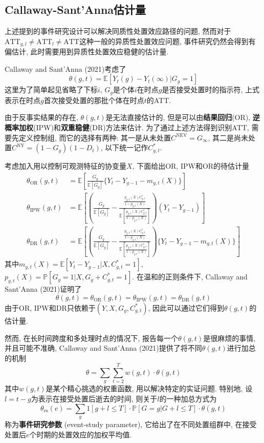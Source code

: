 \documentclass[cn,sakura,14pt,screen,bibstyle=gb7714-2015,math=mtpro2]{elegantnote}
\newcommand{\E}{\mathbb{E}}
\newcommand{\X}{X}
\begin{document}
\subsection{Callaway-Sant'Anna估计量}
上述提到的事件研究设计可以解决同质性处置效应路径的问题, 然而对于$\text{ATT}_{g,l}\neq\text{ATT}_l\ne\text{ATT}$这种一般的异质性处置效应问题, 事件研究仍然会得到有偏估计, 此时需要用到异质性处置效应稳健的估计量.

Callaway and Sant'Anna (2021)考虑了
$$\theta(g,t)=\E[Y_{t}(g)-Y_{t}(\infty)|G_g=1]$$
这里为了简单起见省略了下标$i$, $G_g$是个体$i$在时点$g$是否接受处置时的指示符, 上式表示在时点$g$首次接受处置的那批个体在时点$t$的ATT.

由于反事实结果的存在, $\theta(g,t)$是无法直接估计的, 但是可以由\textbf{结果回归}(OR), \textbf{逆概率加权}(IPW)和\textbf{双重稳健}(DR)方法来估计. 为了通过上述方法得到识别ATT, 需要先定义控制组, 而它的选择有两种: 其一是从未处置$C^\text{NEV}=G_\infty$, 其二是尚未处置$C^\text{NY}=(1-G_g)(1-D_t)$, 以下统一记作$C_{g,t}^\ast$.

考虑加入用以控制可观测特征的协变量$\X$, 下面给出OR, IPW和OR的待估计量
\begin{align*}
\theta_\text{OR}(g,t)&=\E\left[\frac{G_g}{\E[G_g]}\{Y_t-Y_{g-1}-m_{g,t}({X})\}\right] \\
\theta_\text{IPW}(g,t)&=\E\left[\left(\frac{G_g}{\E[G_g]}-\frac{\frac{p_{g,t}(\X)C_{g,t}^\ast}{1-p_{g,t}(\X)}}{\E\left[\frac{p_{g,t}(\X)C_{g,t}^\ast}{1-p_{g,t}(\X)}\right]}\right)(Y_t-Y_{g-1})\right] \\
\theta_{\text{DR}}(g,t)&=\E\left[\left(\frac{G_g}{\E[G_g]}-\frac{\frac{p_{g,t}(\X)C_{g,t}^\ast}{1-p_{g,t}(\X)}}{\E\left[\frac{p_{g,t}(\X)C_{g,t}^\ast}{1-p_{g,t}(\X)}\right]}\right)\{Y_t-Y_{g-1}-m_{g,t}(\X)\}\right]
\end{align*}
其中$m_{g,t}(X)=\E[Y_t-Y_{g-1}|X,C_{g,t}^\ast=1]$, $p_{g,t}(X)=\mathbb{P}[G_g=1|X,G_g+C_{g,t}^\ast=1]$. 在温和的正则条件下, Callaway and Sant'Anna (2021)证明了
$$\theta(g,t)=\theta_\text{OR}(g,t)=\theta_\text{IPW}(g,t)=\theta_\text{DR}(g,t)$$
由于OR, IPW和DR只依赖于$(Y,X,G_g,C_{g,t}^\ast)$, 因此可以通过它们得到$\theta(g,t)$的估计量.

然而, 在长时间跨度和多处理时点的情况下, 报告每一个$\theta(g,t)$是很麻烦的事情, 并且可能不准确, Callaway and Sant'Anna (2021)提供了将不同$\theta(g,t)$进行加总的机制
$$\theta=\sum_g\sum_{t=2}^Tw(g,t)\cdot\theta(g,t)$$
其中$w(g,t)$是某个精心挑选的权重函数, 用以解决特定的实证问题. 特别地, 设$l=t-g$为表示在接受处置后逝去的时间, 则关于$l$的一种加总方式为
$$\theta_{\text{es}}(e)=\sum_g1[g+l\leq T]\cdot\mathbb{P}[G=g|G+l\leq T]\cdot\theta(g,t)$$
称为\textbf{事件研究参数} (event-study parameter), 它给出了在不同处置组群中, 在接受处置后$e$个时期的处置效应的加权平均值.
\end{document}
